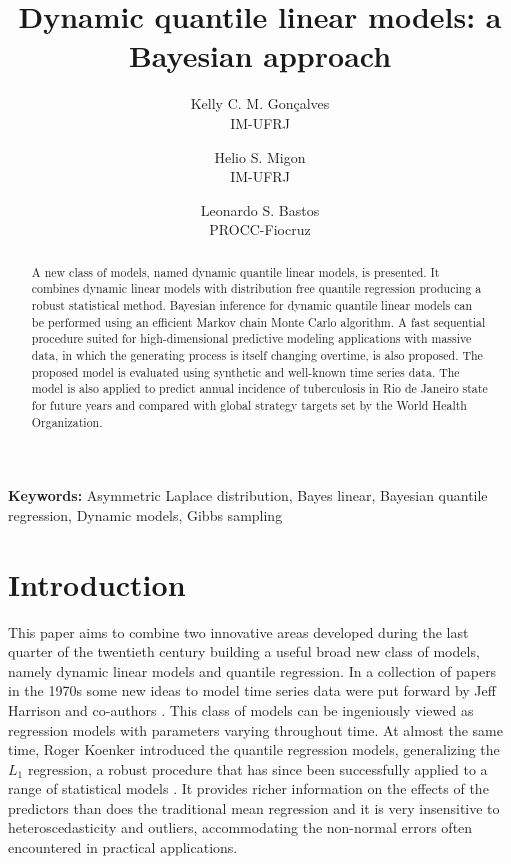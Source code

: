 \documentclass[12pt,a4paper]{article}\usepackage[]{graphicx}\usepackage[]{color}\usepackage{subfigure}
\author{Kelly C. M. Gon\c{c}alves\\ IM-UFRJ \and Helio S. Migon\\ IM-UFRJ \and Leonardo S. Bastos\\ PROCC-Fiocruz }
\title{Dynamic quantile linear models: a Bayesian approach}
\date{}
\begin{document}
\maketitle

\begin{abstract}

A new class of models, named dynamic quantile linear models, is presented. 
It combines dynamic linear models with distribution free quantile regression producing a robust statistical method. 
Bayesian inference for dynamic quantile linear models can be performed using an efficient Markov chain Monte Carlo algorithm. 
A fast sequential procedure suited for high-dimensional predictive modeling applications with massive data, in which the generating process is itself changing overtime, is also proposed. 
The proposed model is evaluated using synthetic and well-known time series data. The model is also applied to
predict annual incidence of tuberculosis in Rio de Janeiro state for future years and compared with global strategy targets set by the World Health Organization. 

\end{abstract}

{\bf Keywords: }Asymmetric Laplace distribution, Bayes linear, Bayesian quantile regression, Dynamic models, Gibbs sampling

\section{Introduction}
\label{sec:intro}


This paper aims to combine two innovative areas  developed during the last quarter of the twentieth century building a useful broad new class of models, namely dynamic linear models and quantile regression. 
In a collection of papers in the 1970s some new ideas to model time series data were put forward  by Jeff Harrison and co-authors \cite{harrison1976bayesian}. 
This class of models can be ingeniously  viewed   as  regression models with parameters varying throughout time. 
At almost the same time, Roger Koenker introduced the quantile regression models, generalizing the $L_1$ regression, a robust procedure that has since been successfully  applied to a range of statistical models \cite{Koenker1978}.
It provides richer information on the effects of the predictors than does the traditional mean regression and it is very insensitive to heteroscedasticity and outliers, accommodating the non-normal errors often encountered in practical applications.
\end{document}
